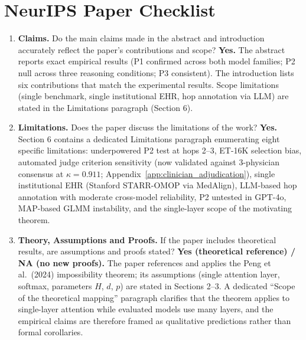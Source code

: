 \documentclass{article}
\begin{document}



\appendix

\section{NeurIPS Paper Checklist}

\begin{enumerate}

\item \textbf{Claims.}
Do the main claims made in the abstract and introduction accurately reflect
the paper's contributions and scope?
\textbf{Yes.} The abstract reports exact empirical results (P1 confirmed
across both model families; P2 null across three reasoning conditions; P3
consistent). The introduction lists six contributions that match the
experimental results. Scope limitations (single benchmark, single
institutional EHR, hop annotation via LLM) are stated in the Limitations
paragraph (Section 6).

\item \textbf{Limitations.}
Does the paper discuss the limitations of the work?
\textbf{Yes.} Section 6 contains a dedicated Limitations paragraph
enumerating eight specific limitations: underpowered P2 test at hops 2--3,
ET-16K selection bias, automated judge criterion sensitivity (now validated
against 3-physician consensus at $\kappa = 0.911$; Appendix~\ref{app:clinician_adjudication}),
single institutional EHR (Stanford STARR-OMOP via MedAlign), LLM-based hop
annotation with moderate cross-model reliability, P2 untested in GPT-4o,
MAP-based GLMM instability, and the single-layer scope of the motivating
theorem.

\item \textbf{Theory, Assumptions and Proofs.}
If the paper includes theoretical results, are assumptions and proofs stated?
\textbf{Yes (theoretical reference) / NA (no new proofs).}
The paper references and applies the Peng et al.\ (2024) impossibility
theorem; its assumptions (single attention layer, softmax, parameters $H$,
$d$, $p$) are stated in Sections 2--3. A dedicated ``Scope of the
theoretical mapping'' paragraph clarifies that the theorem applies to
single-layer attention while evaluated models use many layers, and the
empirical claims are therefore framed as qualitative predictions rather
than formal corollaries.


\end{enumerate}
\end{document}
